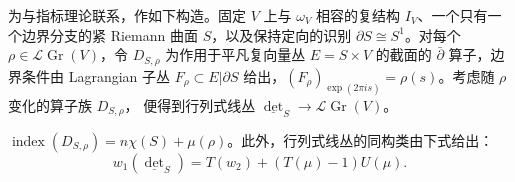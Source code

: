 为与指标理论联系，作如下构造。固定 $V$ 上与 $\omega_V$ 相容的复结构 $I_V$、一个只有一个边界分支的紧 Riemann 曲面 $S$，以及保持定向的识别 $\partial S\cong S^1$。对每个 $\rho\in\mathcal L\operatorname{Gr}(V)$，令 $D_{S,\allowbreak \rho}$ 为作用于平凡复向量丛 $E=S\times V$ 的截面的 $\bar\partial$ 算子，边界条件由 Lagrangian 子丛 $F_\rho\subset E|\partial S$ 给出，$(F_\rho)_{\exp(2\pi is)}=\rho(s)$。考虑随 $\rho$ 变化的算子族 $D_{S,\allowbreak \rho}$，
便得到行列式线丛 $\underline{\det}_S\to\mathcal L\operatorname{Gr}(V)$。
\begin{lemma}\label{st:11.7}
$\operatorname{index}(D_{S,\allowbreak \rho})=n\chi(S)+\mu(\rho)$。此外，行列式线丛的同构类由下式给出：
\begin{equation}\label{eq:11.16}
w_1(\underline{\det}_S)=T(w_2)+(T(\mu)-1)U(\mu).
\end{equation}
\end{lemma}
